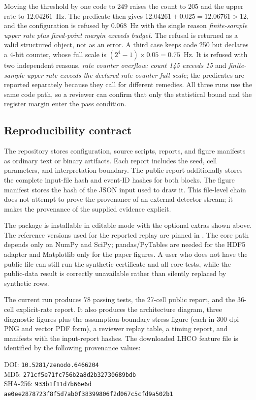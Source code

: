 \documentclass[preprint,12pt]{elsarticle}
\begin{document}
Moving the threshold by one code to 249 raises the count to 205 and the upper
rate to $12.04261$~Hz.  The predicate then gives
$12.04261 + 0.025 = 12.06761 > 12$, and the configuration is refused by
$0.068$~Hz with the single reason
\textit{finite-sample upper rate plus fixed-point margin exceeds budget}.  The
refusal is returned as a valid structured object, not as an error.  A third
case keeps code 250 but declares a 4-bit counter, whose full scale is
$(2^4-1)\times0.05 = 0.75$~Hz.  It is refused with two independent reasons,
\textit{rate counter overflow: count 145 exceeds 15} and \textit{finite-sample
upper rate exceeds the declared rate-counter full scale}; the predicates are
reported separately because they call for different remedies.  All three runs
use the same code path, so a reviewer can confirm that only the statistical
bound and the register margin enter the pass condition.

\subsection{Reproducibility contract}

The repository stores configuration, source scripts, reports, and figure
manifests as ordinary text or binary artifacts.  Each report includes the seed,
cell parameters, and interpretation boundary.  The public report additionally
stores the complete input-file hash and event-ID hashes for both blocks.  The
figure manifest stores the hash of the JSON input used to draw it.  This
file-level chain does not attempt to prove the provenance of an external
detector stream; it makes the provenance of the supplied evidence explicit.

The package is installable in editable mode with the optional extras shown
above.  The reference versions used for the reported replay are pinned in
.  The core path depends only on NumPy and SciPy;
pandas/PyTables are needed for the HDF5 adapter and Matplotlib only for the
paper figures.  A user
who does not have the public file can still run the synthetic certificate and
all core tests, while the public-data result is correctly unavailable rather
than silently replaced by synthetic rows.

The current run produces 78 passing tests, the 27-cell public report, and the
36-cell explicit-rate report.  It also produces the architecture diagram,
three diagnostic figures plus the assumption-boundary stress figure (each in
300 dpi PNG and vector PDF form), a reviewer replay table, a timing report,
and manifests with the input-report hashes.  The downloaded
LHCO feature file is identified by the
following provenance values:
\begin{center}\small
DOI: \verb|10.5281/zenodo.6466204|\\
MD5: \verb|271cf5e71fc756b2a8d2b32730689bdb|\\
SHA-256: \texttt{933b1f11d7b66e6d}\allowbreak
\texttt{ae0ee2878723f8f5d7ab0f38399806f2d067c5cfd9a502b1}
\end{center}
\end{document}
